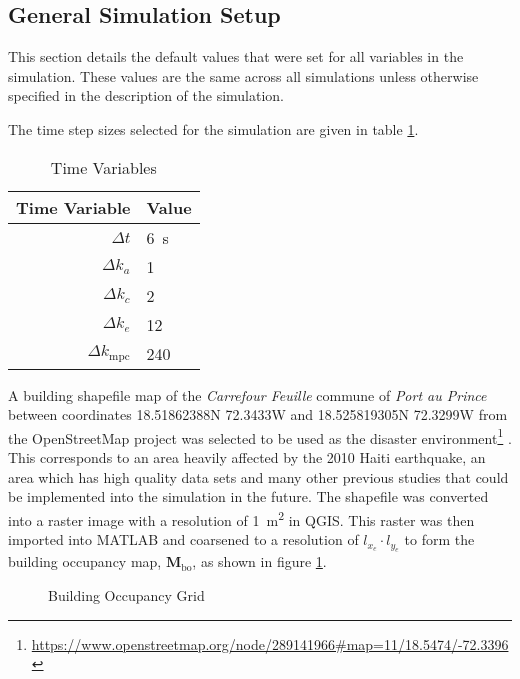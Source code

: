 \documentclass[conference]{IEEEtran}
\begin{document}
\subsection{General Simulation Setup} \label{subsec:generalSimultionSetup}

This section details the default values that were set for all variables in the simulation.
These values are the same across all simulations unless otherwise specified in the description of the simulation.

The time step sizes selected for the simulation are given in table \ref{tab:settings_general_time}.

\begin{table}[]
    \centering
    \caption{Time Variables}
    \label{tab:settings_general_time}
    \begin{tabular}{r|l}
    \toprule
        Time Variable & Value \\
        \midrule
        $\Delta t$      & \SI{6}{\second}\\
        $\Delta k_{a}$  & 1\\
        $\Delta k_{c}$  & 2\\
        $\Delta k_{e}$  & 12\\
        $\Delta k_{\text{mpc}}$ & 240\\
        \bottomrule
    \end{tabular}
\end{table}

A building shapefile map of the \textit{Carrefour Feuille} commune of \textit{Port au Prince} between coordinates 18.51862388N 72.3433W and 18.525819305N 72.3299W from the OpenStreetMap project was selected to be used as the disaster environment\footnote{ \url{https://www.openstreetmap.org/node/289141966#map=11/18.5474/-72.3396}} \cite{openstreetmap}.
This corresponds to an area heavily affected by the 2010 Haiti earthquake, an area which has high quality data sets and many other previous studies that could be implemented into the simulation in the future.
The shapefile was converted into a raster image with a resolution of \SI{1}{\meter \squared} in QGIS.
This raster was then imported into MATLAB and coarsened to a resolution of $l_{x_{e}} \cdot l_{y_{e}}$ to form the building occupancy map, $\bm{M}_{\text{bo}}$, as shown in figure \ref{fig:m_bo}.

\begin{figure}
    \centering
    
    \caption{Building Occupancy Grid}
    \label{fig:m_bo}
\end{figure}
\end{document}
